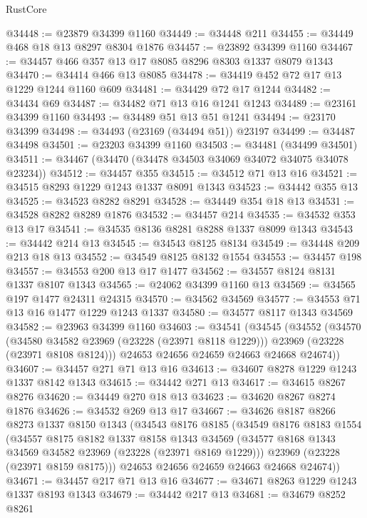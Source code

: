 \begin{lexlean}{RustCore}
\begin{coremodule}
@34448 := @23879 @34399 @1160
@34449 := @34448 @211
@34455 := @34449 @468 @18 @13 @8297 @8304 @1876
@34457 := @23892 @34399 @1160
@34467 := @34457 @466 @357 @13 @17 @8085 @8296 @8303 @1337 @8079 @1343
@34470 := @34414 @466 @13 @8085
@34478 := @34419 @452 @72 @17 @13 @1229 @1244 @1160 @609
@34481 := @34429 @72 @17 @1244
@34482 := @34434 @69
@34487 := @34482 @71 @13 @16 @1241 @1243
@34489 := @23161 @34399 @1160
@34493 := @34489 @51 @13 @51 @1241
@34494 := @23170 @34399
@34498 := @34493 (@23169 (@34494 @51)) @23197
@34499 := @34487 @34498
@34501 := @23203 @34399 @1160
@34503 := @34481 (@34499 @34501)
@34511 := @34467 (@34470 (@34478 @34503 @34069 @34072 @34075 @34078 @23234))
@34512 := @34457 @355
@34515 := @34512 @71 @13 @16
@34521 := @34515 @8293 @1229 @1243 @1337 @8091 @1343
@34523 := @34442 @355 @13
@34525 := @34523 @8282 @8291
@34528 := @34449 @354 @18 @13
@34531 := @34528 @8282 @8289 @1876
@34532 := @34457 @214
@34535 := @34532 @353 @13 @17
@34541 := @34535 @8136 @8281 @8288 @1337 @8099 @1343
@34543 := @34442 @214 @13
@34545 := @34543 @8125 @8134
@34549 := @34448 @209 @213 @18 @13
@34552 := @34549 @8125 @8132 @1554
@34553 := @34457 @198
@34557 := @34553 @200 @13 @17 @1477
@34562 := @34557 @8124 @8131 @1337 @8107 @1343
@34565 := @24062 @34399 @1160 @13
@34569 := @34565 @197 @1477 @24311 @24315
@34570 := @34562 @34569
@34577 := @34553 @71 @13 @16 @1477 @1229 @1243 @1337
@34580 := @34577 @8117 @1343 @34569
@34582 := @23963 @34399 @1160
@34603 := @34541
    (@34545
      (@34552
        (@34570
          (@34580 @34582 @23969 (@23228 (@23971 @8118 @1229)))
          @23969
          (@23228 (@23971 @8108 @8124)))
        @24653
        @24656
        @24659
        @24663
        @24668
        @24674))
@34607 := @34457 @271 @71 @13 @16
@34613 := @34607 @8278 @1229 @1243 @1337 @8142 @1343
@34615 := @34442 @271 @13
@34617 := @34615 @8267 @8276
@34620 := @34449 @270 @18 @13
@34623 := @34620 @8267 @8274 @1876
@34626 := @34532 @269 @13 @17
@34667 := @34626
    @8187
    @8266
    @8273
    @1337
    @8150
    @1343
    (@34543
      @8176
      @8185
      (@34549
        @8176
        @8183
        @1554
        (@34557
          @8175
          @8182
          @1337
          @8158
          @1343
          @34569
          (@34577 @8168 @1343 @34569 @34582 @23969 (@23228 (@23971 @8169 @1229)))
          @23969
          (@23228 (@23971 @8159 @8175)))
        @24653
        @24656
        @24659
        @24663
        @24668
        @24674))
@34671 := @34457 @217 @71 @13 @16
@34677 := @34671 @8263 @1229 @1243 @1337 @8193 @1343
@34679 := @34442 @217 @13
@34681 := @34679 @8252 @8261

\end{coremodule}
\end{lexlean}
